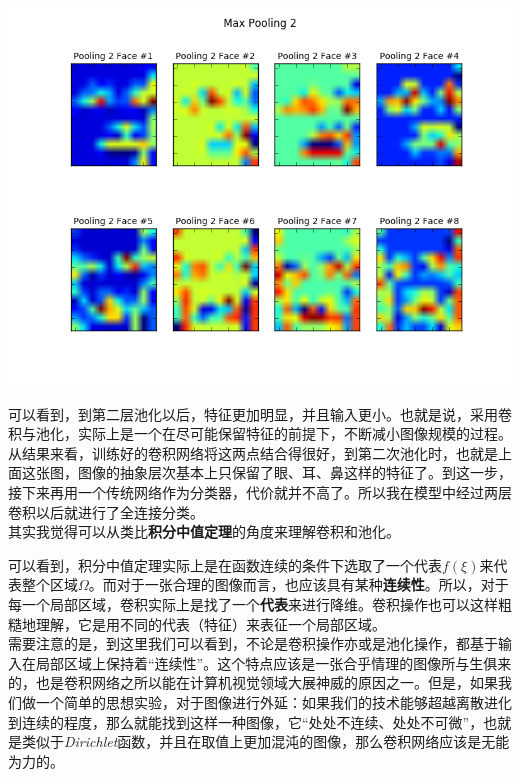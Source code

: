 \documentclass[12pt]{article}
\begin{document}
\begin{center}
\includegraphics[width=0.8\linewidth]{../image/pool2.png}\\
\end{center}

可以看到，到第二层池化以后，特征更加明显，并且输入更小。也就是说，采用卷积与池化，实际上是一个在尽可能保留特征的前提下，不断减小图像规模的过程。从结果来看，训练好的卷积网络将这两点结合得很好，到第二次池化时，也就是上面这张图，图像的抽象层次基本上只保留了眼、耳、鼻这样的特征了。到这一步，接下来再用一个传统网络作为分类器，代价就并不高了。所以我在模型中经过两层卷积以后就进行了全连接分类。\\

其实我觉得可以从类比\textbf{积分中值定理}的角度来理解卷积和池化。\\

\noindent
{}

\bigskip

可以看到，积分中值定理实际上是在函数连续的条件下选取了一个代表$f(\xi)$来代表整个区域$\Omega$。而对于一张合理的图像而言，也应该具有某种\textbf{连续性}。所以，对于每一个局部区域，卷积实际上是找了一个\textbf{代表}来进行降维。卷积操作也可以这样粗糙地理解，它是用不同的代表（特征）来表征一个局部区域。\\

需要注意的是，到这里我们可以看到，不论是卷积操作亦或是池化操作，都基于输入在局部区域上保持着“连续性”。这个特点应该是一张合乎情理的图像所与生俱来的，也是卷积网络之所以能在计算机视觉领域大展神威的原因之一。但是，如果我们做一个简单的思想实验，对于图像进行外延：如果我们的技术能够超越离散进化到连续的程度，那么就能找到这样一种图像，它“处处不连续、处处不可微”，也就是类似于\emph{Dirichlet}函数，并且在取值上更加混沌的图像，那么卷积网络应该是无能为力的。
\end{document}

